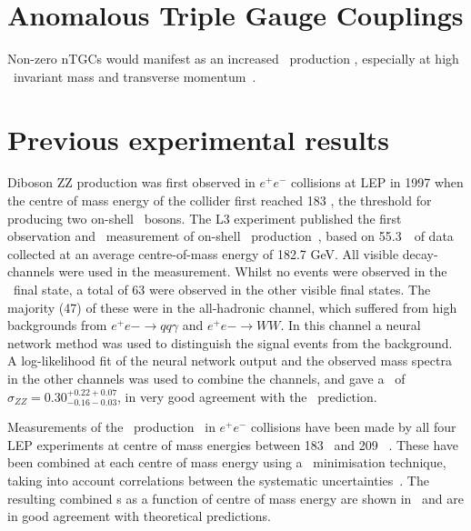 \section{Anomalous Triple Gauge Couplings}
Non-zero nTGCs would manifest as an increased \ZZ\
production \cx, especially at high \ZZ\ invariant mass and transverse
momentum~\cite{Baur:2000ae}.


%
\section{Previous experimental results}

Diboson ZZ production was first observed in $e^+e^-$ collisions at LEP in 1997
when the centre of mass energy of the collider first reached 183 \gev, the
threshold for producing two on-shell \Z\ bosons.
The L3 experiment published the first observation and \cx\ measurement
of on-shell \ZZ\ production~\cite{Acciarri1999281}, based on 55.3~\ipb\
of data collected at an average centre-of-mass energy of 182.7 GeV. All visible
decay-channels were used in the measurement. Whilst no events were
observed in the \llll\ final state, a total of 63 were observed in
the other visible final states. The majority (47) of these were in the
all-hadronic channel, which suffered from high backgrounds from $e^+e-
\rightarrow qq \gamma$ and $e^+e- \rightarrow WW$. In this channel a neural
network method was used to distinguish the signal events from the background. A
log-likelihood fit of the neural network output and the observed mass spectra in
the other channels was used to combine the channels, and gave a \cx\ of
$\sigma_{ZZ} = 0.30^{+0.22 +0.07}_{-0.16 -0.03}$, in very good agreement with
the \sm\ prediction. 

Measurements of the \ZZ\ production \cx\ in $e^+e^-$ collisions have
been made by all four LEP experiments at centre of mass energies between 183
\gev\ and 209
\gev~\cite{Abbiendi:2003va,Abdallah:2003dv,Acciarri:1999ug,Schael:1166743}.
These have been combined at each centre of mass energy using a \chisquared\
minimisation technique, taking into account correlations between the systematic
uncertainties~\cite{bib:LEPEW2006}. The resulting combined \cx s as a
function of centre of mass energy are shown in~\fig{lep-cx} and are in good agreement with
theoretical predictions.

